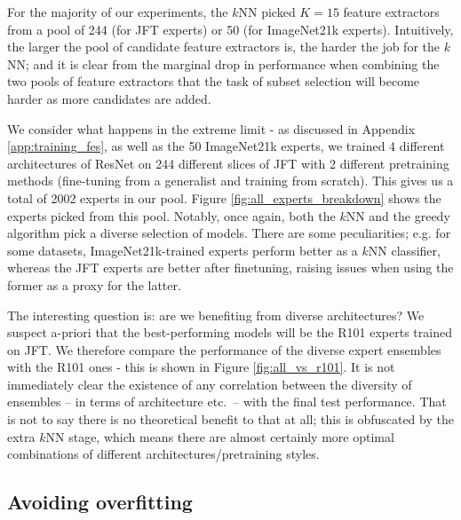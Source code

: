 \documentclass{article} \usepackage{iclr2021_conference,times}
\begin{document}
For the majority of our experiments, the $k$NN picked $K = 15$ feature extractors from a pool of 244 (for JFT experts) or 50 (for ImageNet21k experts). Intuitively, the larger the pool of candidate feature extractors is, the harder the job for the $k$NN; and it is clear from the marginal drop in performance when combining the two pools of feature extractors that the task of subset selection will become harder as more candidates are added.


We consider what happens in the extreme limit - as discussed in Appendix \ref{app:training_fes}, as well as the 50 ImageNet21k experts, we trained 4 different architectures of ResNet on 244 different slices of JFT with 2 different pretraining methods (fine-tuning from a generalist and training from scratch). This gives us a total of 2002 experts in our pool.
Figure \ref{fig:all_experts_breakdown} shows the experts picked from this pool. Notably, once again, both the $k$NN and the greedy algorithm pick a diverse selection of models. There are some peculiarities; e.g. for some datasets, ImageNet21k-trained experts perform better as a $k$NN classifier, whereas the JFT experts are better after finetuning, raising issues when using the former as a proxy for the latter.

The interesting question is: are we benefiting from diverse architectures?
We suspect a-priori that the best-performing models will be the R101 experts trained on JFT.
We therefore compare the performance of the diverse expert ensembles with the R101 ones - this is shown in Figure \ref{fig:all_vs_r101}.
It is not immediately clear the existence of any correlation between the diversity of ensembles -- in terms of architecture etc.\ -- with the final test performance. That is not to say there is no theoretical benefit to that at all; this is obfuscated by the extra $k$NN stage, which means there are almost certainly more optimal combinations of different architectures/pretraining styles.






\subsection{Avoiding overfitting}
\label{app:overfitting}
\end{document}
